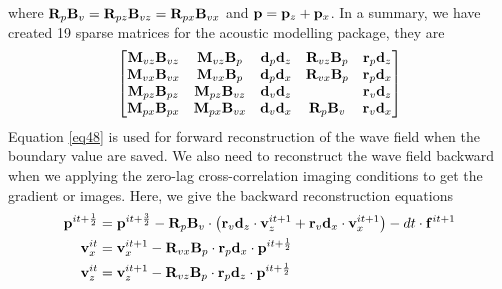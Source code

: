 \documentclass[revised,endfloat]{geophysics}
\begin{document}
where ${\bf R}_p{\bf B}_v = {\bf R}_{pz}{\bf B}_{vz} = {\bf R}_{px}{\bf B}_{vx}$ and ${\bf p} = {\bf p}_z + {\bf p}_x$.
In a summary, we have created 19 sparse matrices for the acoustic modelling package, they are 
\begin{equation}
\begin{bmatrix}
{\bf M}_{vz}{\bf B}_{vz} & {\bf M}_{vz}{\bf B}_{p}& {\bf d}_{p}{\bf d}_{z}& {\bf R}_{vz}{\bf B}_{p}& {\bf r}_{p}{\bf d}_{z} \\
{\bf M}_{vx}{\bf B}_{vx}&  {\bf M}_{vx}{\bf B}_{p}& {\bf d}_{p}{\bf d}_{x}& {\bf R}_{vx}{\bf B}_{p}& {\bf r}_{p}{\bf d}_{x} \\
{\bf M}_{pz}{\bf B}_{pz}&  {\bf M}_{pz}{\bf B}_{vz}& {\bf d}_{v}{\bf d}_{z}& & {\bf r}_{v}{\bf d}_{z} \\
{\bf M}_{px}{\bf B}_{px}&  {\bf M}_{px}{\bf B}_{vx}& {\bf d}_{v}{\bf d}_{x}& {\bf R}_{p}{\bf B}_{v}& {\bf r}_{v}{\bf d}_{x} \\
\end{bmatrix}
\label{eq49}
\end{equation}
Equation \ref{eq48} is used for forward reconstruction of the wave field when the boundary value are saved. We also need to reconstruct the wave field backward when we applying the zero-lag cross-correlation imaging conditions to get the gradient or images. Here, we give the backward reconstruction equations
\begin{equation}
\begin{split}
{\bf p}^{it+\frac{1}{2}}  &= {\bf p}^{it+\frac{3}{2}}  - {\bf R}_{p}{\bf B}_{v} \cdot \left( {\bf r}_v{\bf d}_z \cdot {\bf v}_z^{it+1} +  {\bf r}_v{\bf d}_x \cdot {\bf v}_x^{it+1} \right) - dt \cdot {\bf f}^{it+1}  \\
{\bf v}_x^{it} &=  {\bf v}_x^{it+1} - {\bf R}_{vx}{\bf B}_{p} \cdot {\bf r}_p{\bf d}_x \cdot {\bf p}^{it+\frac{1}{2}}  \\
{\bf v}_z^{it} &= {\bf v}_z^{it+1} - {\bf R}_{vz}{\bf B}_{p} \cdot {\bf r}_p{\bf d}_z \cdot {\bf p}^{it+\frac{1}{2}} \\
\end{split}
\label{eq50}
\end{equation}
\end{document}

